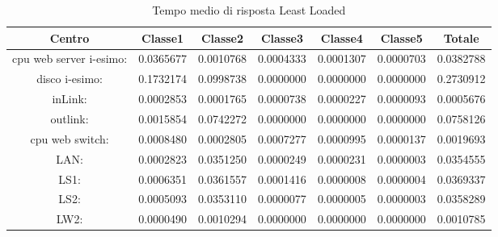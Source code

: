 \begin{table}[H]
\begin{center}\begin{scriptsize}
\begin{tabular}{||c|c|c|c|c|c|c||}
\hline
Centro &Classe1 &Classe2 &Classe3 &Classe4 &Classe5 &Totale\\
\hline
\hline
 cpu web server i-esimo: 	&0.0365677	&0.0010768	&0.0004333	&0.0001307	&0.0000703	&0.0382788\\
\hline
 disco i-esimo: 	&0.1732174	&0.0998738	&0.0000000	&0.0000000	&0.0000000	&0.2730912\\
\hline
 inLink: 	&0.0002853	&0.0001765	&0.0000738	&0.0000227	&0.0000093	&0.0005676\\
\hline
 outlink: 	&0.0015854	&0.0742272	&0.0000000	&0.0000000	&0.0000000	&0.0758126\\
\hline
 cpu web switch: 	&0.0008480	&0.0002805	&0.0007277	&0.0000995	&0.0000137	&0.0019693\\
\hline
 LAN: 	&0.0002823	&0.0351250	&0.0000249	&0.0000231	&0.0000003	&0.0354555\\
\hline
 LS1: 	&0.0006351	&0.0361557	&0.0001416	&0.0000008	&0.0000004	&0.0369337\\
\hline
 LS2: 	&0.0005093	&0.0353110	&0.0000077	&0.0000005	&0.0000003	&0.0358289\\
\hline
 LW2: 	&0.0000490	&0.0010294	&0.0000000	&0.0000000	&0.0000000	&0.0010785\\
\hline
\end{tabular}
\end{scriptsize}\end{center}
\caption{Tempo medio di risposta Least Loaded}
\label{tempomediodirisposta}
\end{table}

